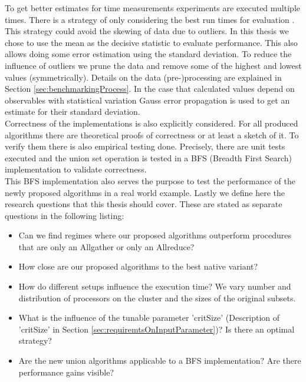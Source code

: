 To get better estimates for time measurements experiments are executed multiple times. There is a strategy of only considering the best run times for evaluation \cite{traeff2025}. This strategy could avoid the skewing of data due to outliers. In this thesis we chose to use the mean as the decisive statistic to evaluate performance. This also allows doing some error estimation using the standard deviation. To reduce the influence of outliers we prune the data and remove some of the highest and lowest values (symmetrically). Details on the data (pre-)processing are explained in Section \ref{sec:benchmarkingProcess}. In the case that calculated values depend on observables with statistical variation Gauss error propagation is used to get an estimate for their standard deviation.\\
Correctness of the implementations is also explicitly considered. For all produced algorithms there are theoretical proofs of correctness or at least a sketch of it. To verify them there is also empirical testing done. Precisely, there are unit tests executed and the union set operation is tested  in a BFS (Breadth First Search) implementation to validate correctness.\\
This BFS implementation also serves the purpose to test the performance of the newly proposed algorithms in a real world example.
Lastly we define here the research questions that this thesis should cover. These are stated as separate questions in the following listing:
\begin{itemize}
	\item Can we find regimes where our proposed algorithms outperform procedures that are only an Allgather or only an Allreduce?
	\item How close are our proposed algorithms to the best native variant? 
	\item How do different setups influence the execution time? We vary number and distribution of processors on the cluster and the sizes of the original subsets.
	\item What is the influence of the tunable parameter 'critSize' (Description of 'critSize' in Section \ref{sec:requiremtsOnInputParameter})? Is there an optimal strategy?
	\item Are the new union algorithms applicable to a BFS implementation? Are there performance gains visible?
\end{itemize}











